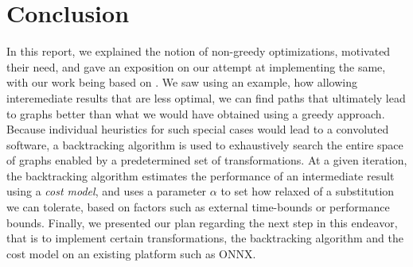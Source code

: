 \documentclass[12pt,a4paper,twoside,openright,bibliography=totocnumbered]{report}
\begin{document}
\chapter{Conclusion}
In this report, we explained the notion of non-greedy optimizations, motivated their need, and gave an exposition on our attempt at implementing the same, with our work being based on \cite{jia2019}. We saw using an example, how allowing interemediate results that are less optimal, we can find paths that ultimately lead to graphs better than what we would have obtained using a greedy approach. Because individual heuristics for such special cases would lead to a convoluted software, a backtracking algorithm is used to exhaustively search the entire space of graphs enabled by a predetermined set of transformations. At a given iteration, the backtracking algorithm estimates the performance of an intermediate result using a \textit{cost model}, and uses a parameter $\alpha$ to set how relaxed of a substitution we can tolerate, based on factors such as external time-bounds or performance bounds. Finally, we presented our plan regarding the next step in this endeavor, that is to implement certain transformations, the backtracking algorithm and the cost model on an existing platform such as ONNX.

\end{document}
